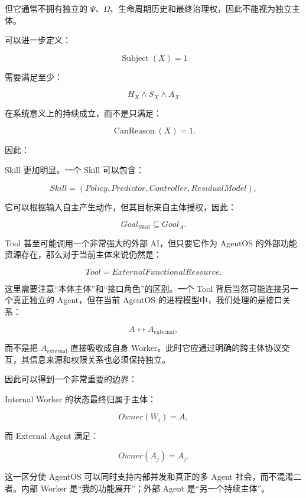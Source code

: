 但它通常不拥有独立的 $\Psi$、$\Omega$、生命周期历史和最终治理权，因此不能视为独立主体。

可以进一步定义：

\[
\operatorname{Subject}(X)
=
1
\]

需要满足至少：

\[
H_X\land S_X\land A_X
\]

在系统意义上的持续成立，而不是只满足：

\[
\operatorname{CanReason}(X)=1.
\]

因此：

\begin{statementbox}
\centering
{}
\end{statementbox}

Skill 更加明显。一个 Skill 可以包含：

\[
Skill
=
(
Policy,
Predictor,
Controller,
ResidualModel
),
\]

它可以根据输入自主产生动作，但其目标来自主体授权，因此：

\[
Goal_{Skill}
\subseteq
Goal_A.
\]

Tool 甚至可能调用一个非常强大的外部 AI，但只要它作为 AgentOS 的外部功能资源存在，那么对于当前主体来说仍然是：

\[
Tool
=
ExternalFunctionalResource.
\]

这里需要注意“本体主体”和“接口角色”的区别。一个 Tool 背后当然可能连接另一个真正独立的 Agent，但在当前 AgentOS 的进程模型中，我们处理的是接口关系：

\[
A
\leftrightarrow
A_{\mathrm{external}},
\]

而不是把 $A_{\mathrm{external}}$ 直接吸收成自身 Worker。此时它应通过明确的跨主体协议交互，其信息来源和权限关系也必须保持独立。

因此可以得到一个非常重要的边界：

\begin{statementbox}
\centering
{}
\end{statementbox}

Internal Worker 的状态最终归属于主体：

\[
Owner(W_i)=A,
\]

而 External Agent 满足：

\[
Owner(A_j)=A_j.
\]

这一区分使 AgentOS 可以同时支持内部并发和真正的多 Agent 社会，而不混淆二者。内部 Worker 是“我的功能展开”；外部 Agent 是“另一个持续主体”。

